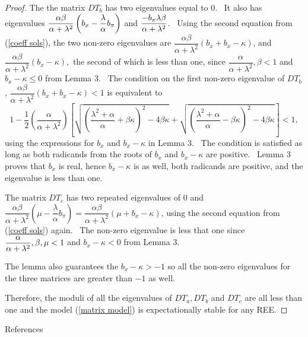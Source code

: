 \documentclass{article}
\begin{document}
\begin{doublespace}
\begin{proof}
The the matrix $DT_{b}$ has two eigenvalues equal to 0. \ It also has
eigenvalues $\dfrac{\alpha \beta }{\alpha +\lambda ^{2}}\left( b_{x}-\dfrac{%
\lambda }{\alpha }b_{\pi }\right) $ and $\dfrac{-b_{\pi }\lambda \beta }{%
\alpha +\lambda ^{2}}$. \ Using the second equation from (\ref{coeff sols}),
the two non-zero eigenvalues are $\dfrac{\alpha \beta }{\alpha +\lambda ^{2}}%
\left( b_{x}+b_{x}-\kappa \right) $, and $\dfrac{\alpha \beta }{\alpha 
+\lambda ^{2}}\left( b_{x}-\kappa \right) ,$ the second of which is less
than one, since $\dfrac{\alpha }{\alpha +\lambda ^{2}},\beta <1$ and $%
b_{x}-\kappa \leq 0$ from Lemma 3. \ The condition on the first non-zero
eigenvalue of $DT_{b}$, $\dfrac{\alpha \beta }{\alpha +\lambda ^{2}}\left(
b_{x}+b_{x}-\kappa \right) <1$ is equivalent to 
\begin{equation*}
1-\frac{1}{2}\left( \dfrac{\alpha }{\alpha +\lambda ^{2}}\right) \left[ 
\sqrt{\left( \frac{\lambda ^{2}+\alpha }{\alpha }+\beta \kappa \right) 
^{2}-4\beta \kappa }+\sqrt{\left( \frac{\lambda ^{2}+\alpha }{\alpha }-\beta
\kappa \right) ^{2}-4\beta \kappa }\right] <1,
\end{equation*}%
using the expressions for $b_{x}$ and $b_{x}-\kappa $ in Lemma 3. \ The
condition is satisfied as long as both radicands from the roots of $b_{x}$
and $b_{x}-\kappa $ are positive. \ Lemma 3 proves that $b_{x}$ is real,
hence $b_{x}-\kappa $ is as well, both radicands are positive, and the
eigenvalue is less than one.

The matrix $DT_{c}$ has two repeated eigenvalues of 0 and $\dfrac{\alpha 
\beta }{\alpha +\lambda ^{2}}\left( \mu -\dfrac{\lambda }{\alpha }b_{\pi 
}\right) =\dfrac{\alpha \beta }{\alpha +\lambda ^{2}}\left( \mu 
+b_{x}-\kappa \right) $, using the second equation from (\ref{coeff sols})
again. \ The non-zero eigenvalue is less that one since $\dfrac{\alpha }{%
\alpha +\lambda ^{2}},\beta ,\mu <1$ and $b_{x}-\kappa <0$ from Lemma 3.

The lemma also guarantees the $b_{x}-\kappa >-1$ so all the non-zero
eigenvalues for the three matrices are greater than $-1$ as well.

Therefore, the moduli of all the eigenvalues of $DT_{a},DT_{b}$ and $DT_{c}$
are all less than one and the model (\ref{matrix model}) is expectationally
stable for any REE.
\end{proof}

\bigskip

{\Large References}


\end{doublespace}
\end{document}
